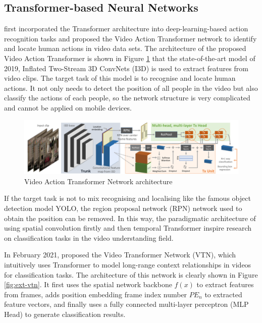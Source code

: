 \subsection{Transformer-based Neural Networks}
\citet{girdhar2019video} first incorporated the Transformer architecture into deep-learning-based action recognition tasks and proposed the Video Action Transformer network to identify and locate human actions in video data sets.
The architecture of the proposed Video Action Transformer is shown in Figure \ref{fig:ext-vatn} that the state-of-the-art model of 2019, Inflated Two-Stream 3D ConvNets (I3D) is used to extract features from video clips.
The target task of this model is to recognise and locate human actions.
It not only needs to detect the position of all people in the video but also classify the actions of each people, so the network structure is very complicated and cannot be applied on mobile devices.

\begin{figure}[!ht]
    \centering
    \includegraphics[width=\textwidth]{literature/imgs/ext-vatn.pdf}
    \caption{Video Action Transformer Network architecture \cite{girdhar2019video}}
    \label{fig:ext-vatn}
\end{figure}

If the target task is not to mix recognising and localising like the famous object detection model YOLO, the region proposal network (RPN) network used to obtain the position can be removed.
In this way, the paradigmatic architecture of using spatial convolution firstly and then temporal Transformer inspire research on classification tasks in the video understanding field.

In February 2021, \citet{neimark2021video} proposed the Video Transformer Network (VTN), which intuitively uses Transformer to model long-range context relationships in videos for classification tasks.
The architecture of this network is clearly shown in Figure \ref{fig:ext-vtn}.
It first uses the spatial network backbone $f(x)$ to extract features from frames, adds position embedding frame index number $PE_n$ to extracted feature vectors, and finally uses a fully connected multi-layer perceptron (MLP Head) to generate classification results.

